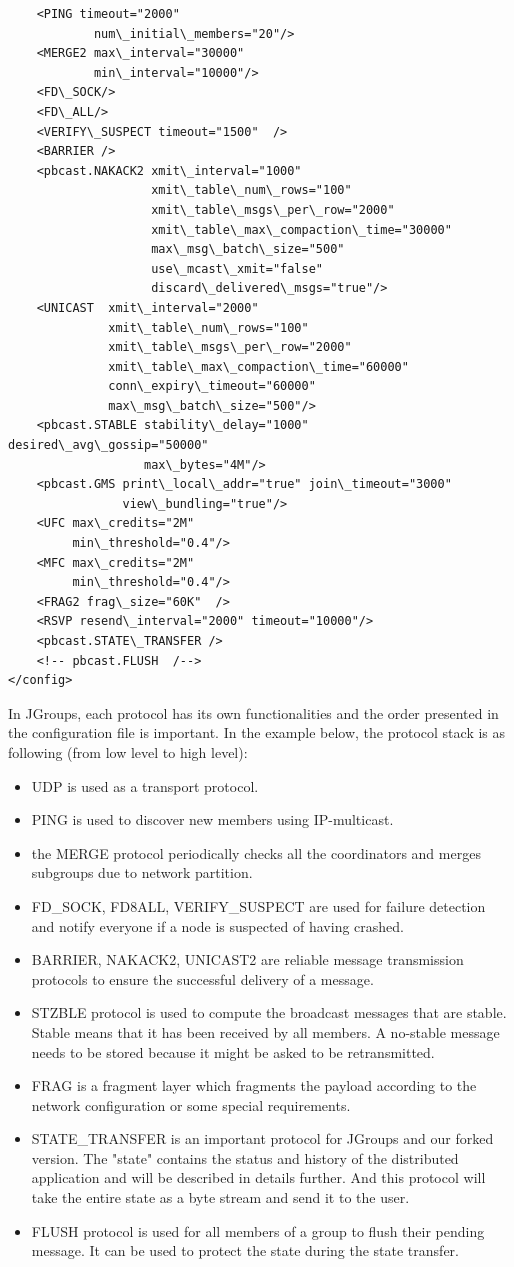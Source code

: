 \documentclass[a4paper,10pt]{report}
\begin{document}
\begin{lstlisting}
    <PING timeout="2000"
            num\_initial\_members="20"/>
    <MERGE2 max\_interval="30000"
            min\_interval="10000"/>
    <FD\_SOCK/>
    <FD\_ALL/>
    <VERIFY\_SUSPECT timeout="1500"  />
    <BARRIER />
    <pbcast.NAKACK2 xmit\_interval="1000"
                    xmit\_table\_num\_rows="100"
                    xmit\_table\_msgs\_per\_row="2000"
                    xmit\_table\_max\_compaction\_time="30000"
                    max\_msg\_batch\_size="500"
                    use\_mcast\_xmit="false"
                    discard\_delivered\_msgs="true"/>
    <UNICAST  xmit\_interval="2000"
              xmit\_table\_num\_rows="100"
              xmit\_table\_msgs\_per\_row="2000"
              xmit\_table\_max\_compaction\_time="60000"
              conn\_expiry\_timeout="60000"
              max\_msg\_batch\_size="500"/>
    <pbcast.STABLE stability\_delay="1000" desired\_avg\_gossip="50000"
                   max\_bytes="4M"/>
    <pbcast.GMS print\_local\_addr="true" join\_timeout="3000"
                view\_bundling="true"/>
    <UFC max\_credits="2M"
         min\_threshold="0.4"/>
    <MFC max\_credits="2M"
         min\_threshold="0.4"/>
    <FRAG2 frag\_size="60K"  />
    <RSVP resend\_interval="2000" timeout="10000"/>
    <pbcast.STATE\_TRANSFER />
    <!-- pbcast.FLUSH  /-->
</config>
\end{lstlisting}
In JGroups, each protocol has its own functionalities and the order presented in the configuration file is important. 
In the example below, the protocol stack is as following (from low level to high level):
\begin{itemize}
\item UDP is used as a transport protocol.
\item PING is used to discover new members using IP-multicast.
\item the MERGE protocol periodically checks all the coordinators and merges subgroups due to network partition.
\item FD\_SOCK, FD8ALL, VERIFY\_SUSPECT are used for failure detection and notify everyone if a node is suspected of having crashed.
\item BARRIER, NAKACK2, UNICAST2 are reliable message transmission protocols to ensure the successful delivery of a message.
\item STZBLE protocol is used to compute the broadcast messages that are stable. Stable means that it has been received by all members. A no-stable message needs to be stored because it might be asked to be retransmitted.
\item FRAG is a fragment layer which fragments the payload according to the network configuration or some special requirements.
\item STATE\_TRANSFER is an important protocol for JGroups and our forked version. The "state" contains the status and history of the distributed application and will be described in details further. And this protocol will take the entire state as a byte stream and send it to the user.
\item FLUSH protocol is used for all members of a group to flush their pending message. It can be used to protect the state during the state transfer.
\end{itemize}
\end{document}
